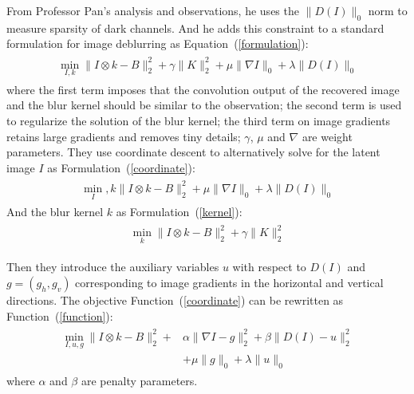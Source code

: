 \documentclass[twocolumn]{article}
\begin{document}
	From Professor Pan's analysis and observations, he uses the $\parallel D(I)\parallel_0$ norm to measure sparsity of dark channels. And he adds this constraint to a standard formulation for image deblurring as Equation~(\ref{formulation}):
	\begin{equation}
	\begin{aligned}
	\begin{split}
	\min_{I,k} \parallel I\otimes k-B \parallel_2^2+\gamma \parallel K \parallel_2^2 +\mu \parallel \nabla I\parallel_0+\lambda \parallel D(I) \parallel_0   \label{formulation}
	\end{split} 
	\end{aligned}
	\end{equation}
	where the first term imposes that the convolution output of the recovered image and the blur kernel should be similar to the observation; the second term is used to regularize the solution of the blur kernel; the third term on image gradients retains large gradients and removes tiny details\cite{Pan2014Deblurring}; $\gamma$, $\mu$ and $\nabla$ are weight parameters. They use coordinate descent to alternatively solve for the latent image $I$ as Formulation~(\ref{coordinate}):
	\begin{equation}
	\begin{aligned}
	\begin{split}
	\min_I,k\parallel I\otimes k-B \parallel_2^2+\mu \parallel \nabla I\parallel_0+\lambda \parallel D(I) \parallel_0    \label{coordinate}
	\end{split}
	\end{aligned}
	\end{equation}
	And the blur kernel $k$ as Formulation~(\ref{kernel}):
	\begin{equation}
	\begin{aligned}
	\begin{split}
	\min_k \parallel I\otimes k-B \parallel_2^2+\gamma \parallel K \parallel_2^2 \label{kernel}
	\end{split}
	\end{aligned}
	\end{equation}

	Then they introduce the auxiliary variables $u$ with respect to $D(I)$ and $g = (g_h, g_v)$ corresponding to image gradients in the horizontal and vertical directions. The objective Function~(\ref{coordinate}) can be rewritten as Function~(\ref{function}):
	\begin{equation}
	\begin{aligned}
	\begin{split}
	\min_{I,u,g} \parallel I\otimes k-B \parallel_2^2+&\alpha \parallel \nabla I-g \parallel_2^2+\beta \parallel D(I)-u \parallel_2^2 \\
	&+\mu \parallel g\parallel_0+\lambda\parallel u\parallel_0     \label{function}
	\end{split}
	\end{aligned}
	\end{equation}
	where $\alpha$ and $\beta$ are penalty parameters.
	
\end{document}
